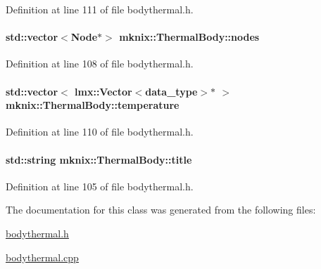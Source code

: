 Definition at line 111 of file bodythermal.\+h.

\hypertarget{classmknix_1_1_thermal_body_aa74c56a18ed24997dfc4bdb90a7f67bd}{}
\paragraph[{nodes}]{\setlength{\rightskip}{0pt plus 5cm}std\+::vector$<${\bf Node}$\ast$$>$ mknix\+::\+Thermal\+Body\+::nodes\hspace{0.3cm}{\ttfamily [protected]}}\label{classmknix_1_1_thermal_body_aa74c56a18ed24997dfc4bdb90a7f67bd}


Definition at line 108 of file bodythermal.\+h.

\hypertarget{classmknix_1_1_thermal_body_af5ed33528eba7a3bf39a4bdc3d2c9ed3}{}
\paragraph[{temperature}]{\setlength{\rightskip}{0pt plus 5cm}std\+::vector$<$ {\bf lmx\+::\+Vector}$<${\bf data\+\_\+type}$>$$\ast$ $>$ mknix\+::\+Thermal\+Body\+::temperature\hspace{0.3cm}{\ttfamily [protected]}}\label{classmknix_1_1_thermal_body_af5ed33528eba7a3bf39a4bdc3d2c9ed3}


Definition at line 110 of file bodythermal.\+h.

\hypertarget{classmknix_1_1_thermal_body_ad1b2b790274d2c987a8c461da0a3282f}{}
\paragraph[{title}]{\setlength{\rightskip}{0pt plus 5cm}std\+::string mknix\+::\+Thermal\+Body\+::title\hspace{0.3cm}{\ttfamily [protected]}}\label{classmknix_1_1_thermal_body_ad1b2b790274d2c987a8c461da0a3282f}


Definition at line 105 of file bodythermal.\+h.



The documentation for this class was generated from the following files\+:\begin{DoxyCompactItemize}
\item 
\hyperlink{bodythermal_8h}{bodythermal.\+h}\item 
\hyperlink{bodythermal_8cpp}{bodythermal.\+cpp}\end{DoxyCompactItemize}
